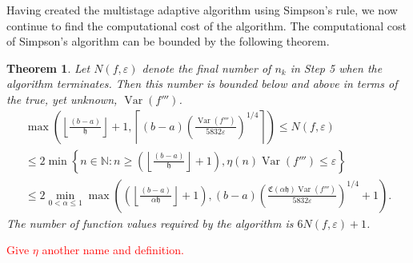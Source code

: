 \documentclass[draft]{iitthesis}
\DeclareMathOperator{\Var}{Var}
\newtheorem{theorem}{Theorem}
\theoremstyle{definition}
\theoremstyle{remark}
\begin{document}
Having created the multistage adaptive algorithm using Simpson's rule, we now continue to find the computational cost of the algorithm. The computational cost of Simpson's algorithm can be bounded by the following theorem.
\begin{theorem}\label{uppbndcostSimp}
    Let $N(f,\varepsilon)$ denote the final number of $n_k$ in Step 5 when the algorithm terminates. Then this number is bounded below and above in terms of the true, yet unknown, $\Var(f''')$.
    \begin{multline}\label{uppbndcostineq}
        \max\left(\left\lfloor\frac{(b-a)}{\mathfrak{h}}\right\rfloor+1,\left\lceil(b-a)\left(\frac{\Var(f''')}{5832\varepsilon}\right)^{1/4}\right\rceil\right)\leq N(f,\varepsilon)\\ \leq 2\min\left\{n\in\mathbb{N}:n\geq\left(\left\lfloor\frac{(b-a)}{\mathfrak{h}}\right\rfloor+1\right),\eta(n)\Var(f''')\leq\varepsilon\right\}\\ \leq 2\min_{0<\alpha\leq1}\max\left(\left(\left\lfloor\frac{(b-a)}{\alpha\mathfrak{h}}\right\rfloor+1\right),(b-a)\left(\frac{\mathfrak{C}(\alpha\mathfrak{h})\Var(f''')}{5832\varepsilon}\right)^{1/4}+1\right).
    \end{multline}
    The number of function values required by the algorithm is $6N(f,\varepsilon)+1$.
\end{theorem}
\textcolor{red}{Give $\eta$ another name and definition.}
\end{document}
